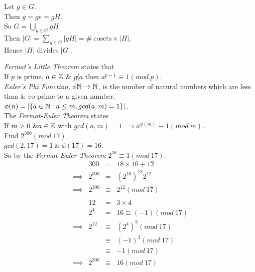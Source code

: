 \documentclass[11pt,a4paper]{article}
\begin{document}
Let $g \in G$.\\
Then $g=ge=gH$.\\
So $G=\bigcup_{g\in G}gH$\\

Then $|G|=\sum_{g \in G}|gH|=\mathrm{\#\ cosets}\times|H|$.\\
Hence $|H|$ divides $|G|$.\\


\textit{Fermat's Little Theorem} states that\\
\-\hspace{2em}If $p$ is prime, $a \in \mathbb{Z}$ \& $p \not| a$ then $a^{p-1}\equiv 1(mod\ p)$.\\
\textit{Euler's Phi Function}, $\phi \mathbb{N}\to\mathbb{N}$, is the number of natural numbers which are less than \& co-prime to a given number.\\
\-\hspace{2em}$\phi(n)=|\{a\in\mathbb{N}:a\leq m, gcd(a,m)=1\}|$.\\
The \textit{Fermat-Euler Theorem} states\\
\-\hspace{2em}If $m>0\ \& a\in\mathbb{Z}$ with $gcd(a,m)=1\implies a^{\phi(m)}\equiv1(mod\ m)$.\\

Find $2^300(mod\ 17)$.\\

$gcd(2, 17)=1\ \&\ \phi(17) = 16$.\\
So by the \textit{Fermat-Euler Theorem} $2^{16}\equiv 1(mod\ 17)$.\\

\[\begin{array}{rrcl}
&300&=&18\times16+12\\
\implies&2^{300}&=&(2^{16})^{18}2^{12}\\
\implies&2^{300}&\equiv& 2^{12}(mod\ 17)\\
\\&12&=&3\times4\\
&2^4&=&16\equiv(-1)(mod\ 17)\\
\implies&2^{12}&\equiv&(2^4)^3(mod\ 17)\\
&&\equiv&(-1)^3(mod\ 17)\\
&&\equiv&-1(mod\ 17)\\
\implies&2^{300}&\equiv&\underline{16(mod\ 17)}
\end{array}\]
\end{document}
